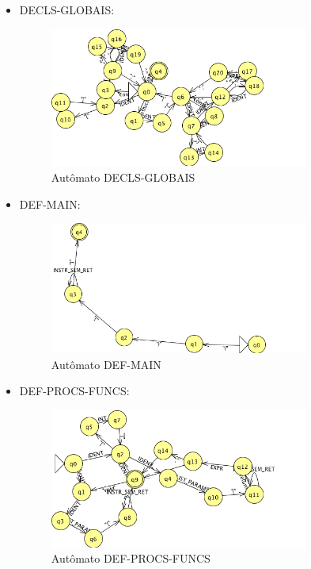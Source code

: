 \begin{itemize}
	\item DECLS-GLOBAIS:
	\begin{figure}[H]
		\centering 
		\includegraphics[width=0.8\textwidth]{images/submaquinas/DECLS-GLOBAIS.png}  
		\caption{Autômato DECLS-GLOBAIS}
	\end{figure}
	
	\item DEF-MAIN:
	\begin{figure}[H]
		\centering 
		\includegraphics[width=0.8\textwidth]{images/submaquinas/DEF-MAIN.png}  
		\caption{Autômato DEF-MAIN}
	\end{figure}
	
	\item DEF-PROCS-FUNCS:
	\begin{figure}[H]
		\centering 
		\includegraphics[width=0.8\textwidth]{images/submaquinas/DEF-PROCS-FUNCS.png}  
		\caption{Autômato DEF-PROCS-FUNCS}
	\end{figure}
	

\end{itemize}

